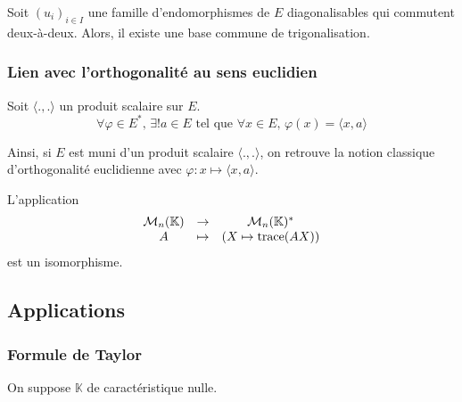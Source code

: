 
  \begin{application}
    Soit $(u_i)_{i \in I}$ une famille d'endomorphismes de $E$ diagonalisables qui commutent deux-à-deux. Alors, il existe une base commune de trigonalisation.
  \end{application}

  \subsubsection{Lien avec l'orthogonalité au sens euclidien}


  \begin{theorem}
    Soit $\langle ., . \rangle$ un produit scalaire sur $E$.
    \[ \forall \varphi \in E^*, \, \exists! a \in E \text{ tel que } \forall x \in E, \, \varphi(x) = \langle x, a \rangle \]
  \end{theorem}


  Ainsi, si $E$ est muni d'un produit scalaire $\langle ., . \rangle$, on retrouve la notion classique d'orthogonalité euclidienne avec $\varphi : x \mapsto \langle x, a \rangle$.


  \begin{example}
    L'application
    \[
    \begin{array}{ccc}
      \mathcal{M}_n(\mathbb{K}) &\rightarrow& \mathcal{M}_n(\mathbb{K})^* \\
      A &\mapsto& (X \mapsto \operatorname{trace}(AX))
    \end{array}
    \]
    est un isomorphisme.
  \end{example}

  \subsection{Applications}

  \subsubsection{Formule de Taylor}


  On suppose $\mathbb{K}$ de caractéristique nulle.

